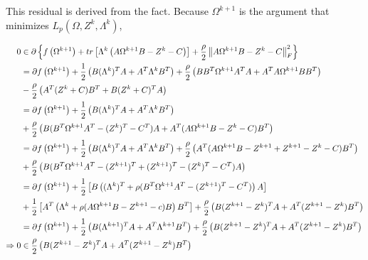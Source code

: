 \documentclass[11pt,]{report}
\begin{document}
This residual is derived from the fact. Because \(\Omega^{k + 1}\) is the argument that minimizes \(L_{p}\left( \Omega, Z^{k}, \Lambda^{k} \right)\),

\begin{equation}
\begin{split}
  0 &\in \partial \left\{ f\left(\Omega^{k + 1}\right) + tr\left[ \Lambda^{k}\left( A\Omega^{k + 1}B - Z^{k} - C \right) \right] + \frac{\rho}{2}\left\| A\Omega^{k + 1}B - Z^{k} - C \right\|_{F}^{2} \right\} \\
  &= \partial f\left(\Omega^{k + 1} \right) + \frac{1}{2}\left(B(\Lambda^{k})^{T}A + A^{T}\Lambda^{k}B^{T} \right) + \frac{\rho}{2}\left( BB^{T}\Omega^{k + 1}A^{T}A + A^{T}A\Omega^{k + 1}BB^{T} \right) \\
  &- \frac{\rho}{2}\left( A^{T}(Z^{k} + C)B^{T} + B(Z^{k} + C)^{T}A \right) \\
  &= \partial f\left(\Omega^{k + 1} \right) + \frac{1}{2}\left(B(\Lambda^{k})^{T}A + A^{T}\Lambda^{k}B^{T} \right) \\
  &+ \frac{\rho}{2}\left( B(B^{T}\Omega^{k + 1}A^{T} - (Z^{k})^{T} - C^{T})A + A^{T}(A\Omega^{k + 1}B - Z^{k} - C)B^{T} \right) \\
  &= \partial f\left(\Omega^{k + 1} \right) + \frac{1}{2}\left( B(\Lambda^{k})^{T}A + A^{T}\Lambda^{k}B^{T} \right) + \frac{\rho}{2}\left(A^{T}(A\Omega^{k + 1}B - Z^{k + 1} + Z^{k + 1} - Z^{k} - C)B^{T} \right) \\
  &+ \frac{\rho}{2}\left(B(B^{T}\Omega^{k + 1}A^{T} - (Z^{k + 1})^{T} + (Z^{k + 1})^{T} - (Z^{k})^{T} - C^{T})A \right) \\
  &= \partial f\left(\Omega^{k + 1} \right) + \frac{1}{2}\left[ B\left((\Lambda^{k})^{T} + \rho(B^{T}\Omega^{k + 1}A^{T} - (Z^{k + 1})^{T} - C^{T}) \right)A \right] \\
  &+ \frac{1}{2}\left[ A^{T}\left(\Lambda^{k} + \rho(A\Omega^{k + 1}B - Z^{k + 1} - c)B \right)B^{T} \right] + \frac{\rho}{2}\left(B(Z^{k + 1} - Z^{k})^{T}A + A^{T}(Z^{k + 1} - Z^{k})B^{T} \right) \\
  &= \partial f\left(\Omega^{k + 1} \right) + \frac{1}{2}\left(B(\Lambda^{k + 1})^{T}A + A^{T}\Lambda^{k + 1}B^{T} \right) + \frac{\rho}{2}\left(B(Z^{k + 1} - Z^{k})^{T}A + A^{T}(Z^{k + 1} - Z^{k})B^{T} \right) \\
  \Rightarrow 0 &\in \frac{\rho}{2}\left( B(Z^{k + 1} - Z^{k})^{T}A + A^{T}(Z^{k + 1} - Z^{k})B^{T} \right)
\label{eq:appendixstopproof}\notag
\end{split}
\end{equation}
\end{document}
